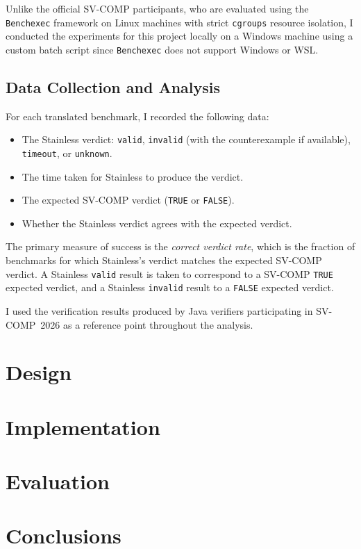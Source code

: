 \documentclass[11pt,titlepage,openright]{book}
\begin{document}
Unlike the official SV-COMP participants, 
who are evaluated using the \texttt{Benchexec} 
framework on Linux machines with strict 
\texttt{cgroups} resource isolation, I conducted 
the experiments for this project locally on a 
Windows machine using a custom batch script since 
\texttt{Benchexec} does not support Windows or WSL. 
\section{Data Collection and Analysis}
\label{sec:data-collection}
 
For each translated benchmark, I recorded the following data:
 
\begin{itemize}
  \item The Stainless verdict: \texttt{valid}, \texttt{invalid}
        (with the counterexample if available), \texttt{timeout}, or
        \texttt{unknown}.
  \item The time taken for Stainless to produce the verdict.
  \item The expected SV-COMP verdict (\texttt{TRUE} or \texttt{FALSE}).
  \item Whether the Stainless verdict agrees with the expected verdict.
\end{itemize}
 
The primary measure of success is the \emph{correct verdict rate}, which is the
fraction of benchmarks for which Stainless's verdict matches the expected
SV-COMP verdict. A Stainless \texttt{valid} result is taken to correspond
to a SV-COMP \texttt{TRUE} expected verdict, and a Stainless
\texttt{invalid} result to a \texttt{FALSE} expected verdict.
 
I used the verification results produced by Java verifiers participating in
SV-COMP~2026 as a reference point throughout the analysis.
\chapter{Design}

\chapter{Implementation}

\chapter{Evaluation}

\chapter{Conclusions}



\end{document}
